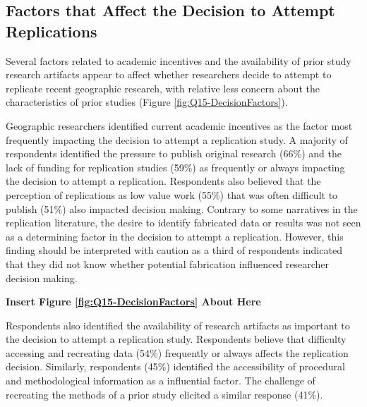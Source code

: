 \documentclass[]{interact}
\theoremstyle{plain}%
\theoremstyle{definition}
\theoremstyle{remark}
\begin{document}
\subsection*{Factors that Affect the Decision to Attempt Replications}
Several factors related to academic incentives and the availability of prior study research artifacts appear to affect whether researchers decide to attempt to replicate recent geographic research, with relative less concern about the characteristics of prior studies (Figure \ref{fig:Q15-DecisionFactors}).

Geographic researchers identified current academic incentives as the factor most frequently impacting the decision to attempt a replication study. 
A majority of respondents identified the pressure to publish original research (66\%) and the lack of funding for replication studies (59\%) as frequently or always impacting the decision to attempt a replication.
Respondents also believed that the perception of replications as low value work (55\%) that was often difficult to publish (51\%) also impacted decision making.  
Contrary to some narratives in the replication literature, the desire to identify fabricated data or results was not seen as a determining factor in the decision to attempt a replication. 
However, this finding should be interpreted with caution as a third of respondents indicated that they did not know whether potential fabrication influenced researcher decision making.  

\begin{center}
\textbf{Insert Figure \ref{fig:Q15-DecisionFactors} About Here}
\end{center}

Respondents also identified the availability of research artifacts as important to the decision to attempt a replication study.
Respondents believe that difficulty accessing and recreating data (54\%) frequently or always affects the replication decision.
Similarly, respondents (45\%) identified the accessibility of procedural and methodological information as a influential factor. 
The challenge of recreating the methods of a prior study elicited a similar response (41\%).
\end{document}
